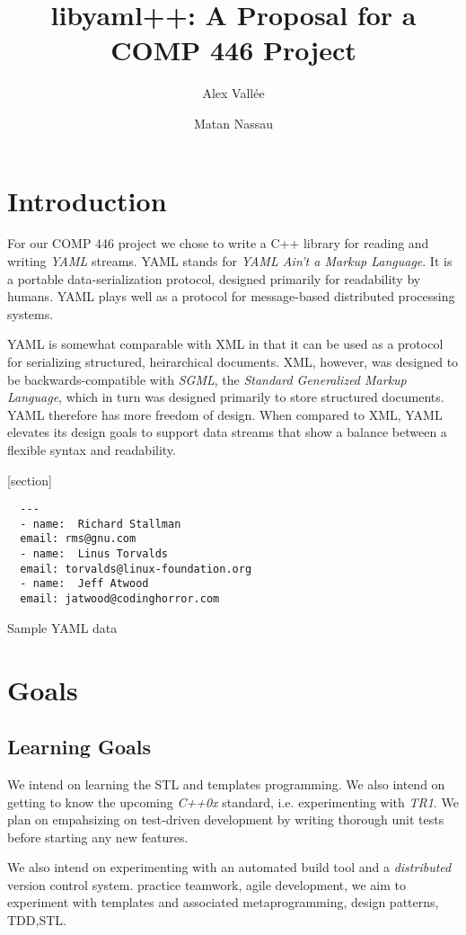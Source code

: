 \documentclass{article}
\author{Alex Vall\'ee \and Matan Nassau}
\title{libyaml++:  A Proposal for a COMP 446 Project}
\begin{document}
\maketitle

\section{Introduction}
For our COMP 446 project we chose to write a C++ library for reading and writing \emph{YAML} streams.  YAML stands for \emph{YAML Ain't a Markup Language}.  It is a portable data-serialization protocol, designed primarily for readability by humans.  YAML plays well as a protocol for message-based distributed processing systems.

YAML is somewhat comparable with XML in that it can be used as a protocol for serializing structured, heirarchical documents.  XML, however, was designed to be backwards-compatible with \emph{SGML}, the \emph{Standard Generalized Markup Language}, which in turn was designed primarily to store structured documents.  YAML therefore has more freedom of design.  When compared to XML, YAML elevates its design goals to support data streams that show a balance between a flexible syntax and readability.

[section]
\begin{Figure}
  \begin{verbatim}
  ---
  - name:  Richard Stallman
  email: rms@gnu.com
  - name:  Linus Torvalds
  email: torvalds@linux-foundation.org
  - name:  Jeff Atwood
  email: jatwood@codinghorror.com
  \end{verbatim}
  \caption{Sample YAML data}
\end{Figure}

\section{Goals}

\subsection{Learning Goals}
We intend on learning the STL and templates programming. We also intend on getting to know the upcoming \emph{C++0x} standard, i.e. experimenting with \emph{TR1}.  We plan on empahsizing on test-driven development by writing thorough unit tests before starting any new features.

We also intend on experimenting with an automated build tool and a \emph{distributed} version control system.  practice teamwork, agile development, we aim to experiment with templates and associated metaprogramming, design patterns, TDD,STL.
\end{document}
